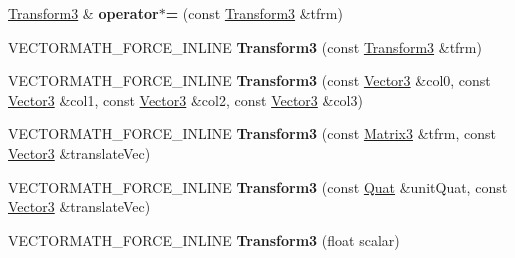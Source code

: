 \begin{DoxyCompactItemize}
\hyperlink{classVectormath_1_1Aos_1_1Transform3}{Transform3} \& {\bfseries operator$\ast$=} (const \hyperlink{classVectormath_1_1Aos_1_1Transform3}{Transform3} \&tfrm)
\item 
\mbox{\label{classVectormath_1_1Aos_1_1Transform3_aafa1a3ff376c54610ad183b231c32193}} 
V\+E\+C\+T\+O\+R\+M\+A\+T\+H\+\_\+\+F\+O\+R\+C\+E\+\_\+\+I\+N\+L\+I\+NE {\bfseries Transform3} (const \hyperlink{classVectormath_1_1Aos_1_1Transform3}{Transform3} \&tfrm)
\item 
\mbox{\label{classVectormath_1_1Aos_1_1Transform3_aede20208cca61cb3153849707fcd05c7}} 
V\+E\+C\+T\+O\+R\+M\+A\+T\+H\+\_\+\+F\+O\+R\+C\+E\+\_\+\+I\+N\+L\+I\+NE {\bfseries Transform3} (const \hyperlink{classVectormath_1_1Aos_1_1Vector3}{Vector3} \&col0, const \hyperlink{classVectormath_1_1Aos_1_1Vector3}{Vector3} \&col1, const \hyperlink{classVectormath_1_1Aos_1_1Vector3}{Vector3} \&col2, const \hyperlink{classVectormath_1_1Aos_1_1Vector3}{Vector3} \&col3)
\item 
\mbox{\label{classVectormath_1_1Aos_1_1Transform3_a48b610b8feeb0c9a3e93ee050c7c1c6f}} 
V\+E\+C\+T\+O\+R\+M\+A\+T\+H\+\_\+\+F\+O\+R\+C\+E\+\_\+\+I\+N\+L\+I\+NE {\bfseries Transform3} (const \hyperlink{classVectormath_1_1Aos_1_1Matrix3}{Matrix3} \&tfrm, const \hyperlink{classVectormath_1_1Aos_1_1Vector3}{Vector3} \&translate\+Vec)
\item 
\mbox{\label{classVectormath_1_1Aos_1_1Transform3_a54f039ec2e81b7a889897e2e363b8b0a}} 
V\+E\+C\+T\+O\+R\+M\+A\+T\+H\+\_\+\+F\+O\+R\+C\+E\+\_\+\+I\+N\+L\+I\+NE {\bfseries Transform3} (const \hyperlink{classVectormath_1_1Aos_1_1Quat}{Quat} \&unit\+Quat, const \hyperlink{classVectormath_1_1Aos_1_1Vector3}{Vector3} \&translate\+Vec)
\item 
\mbox{\label{classVectormath_1_1Aos_1_1Transform3_a3cb83ed1cf9176ab1ac5b0392d48a9f3}} 
V\+E\+C\+T\+O\+R\+M\+A\+T\+H\+\_\+\+F\+O\+R\+C\+E\+\_\+\+I\+N\+L\+I\+NE {\bfseries Transform3} (float scalar)
\item 
\mbox{\label{classVectormath_1_1Aos_1_1Transform3_a17e9be3eba2cb81725a902d59eeb3fce}} 

\end{DoxyCompactItemize}
